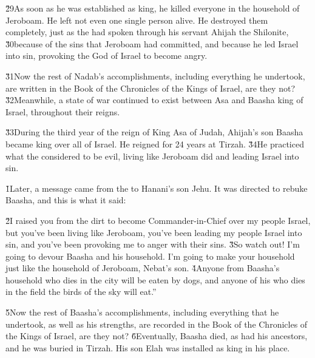 \v{29}As soon as he was established as king, he killed everyone in the household of Jeroboam. He left not even one single person alive. He destroyed them completely, just as the  had spoken through his servant Ahijah the Shilonite, \v{30}because of the sins that Jeroboam had committed, and because he led Israel into sin, provoking the  God of Israel to become angry.

\v{31}Now the rest of Nadab's accomplishments, including everything he undertook, are written in the Book of the Chronicles of the Kings of Israel, are they not? \v{32}Meanwhile, a state of war continued to exist between Asa and Baasha king of Israel, throughout their reigns.

\v{33}During the third year of the reign of King Asa of Judah, Ahijah's son Baasha became king over all of Israel. He reigned for 24 years at Tirzah. \v{34}He practiced what the  considered to be evil, living like Jeroboam did and leading Israel into sin.

\v{1}Later, a message came from the  to Hanani's son Jehu. It was directed to rebuke Baasha, and this is what it said:

\begin{poetry}
\poeml \v{2}I raised you from the dirt to become Commander-in-Chief over my people Israel, but you've been living like Jeroboam, you've been leading my people Israel into sin, and you've been provoking me to anger with their sins. \v{3}So watch out! I'm going to devour Baasha and his household. I'm going to make your household just like the household of Jeroboam, Nebat's son. \v{4}Anyone from Baasha's household who dies in the city will be eaten by dogs, and anyone of his who dies in the field the birds of the sky will eat.''
\end{poetry}

\v{5}Now the rest of Baasha's accomplishments, including everything that he undertook, as well as his strengths, are recorded in the Book of the Chronicles of the Kings of Israel, are they not? \v{6}Eventually, Baasha died, as had his ancestors, and he was buried in Tirzah. His son Elah was installed as king in his place.


